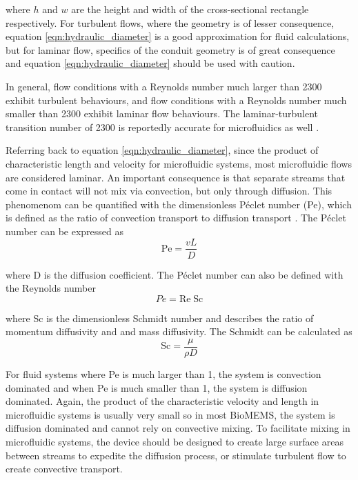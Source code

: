 \noindent where $h$ and $w$ are the height and width of the cross-sectional rectangle respectively. For turbulent flows, where the geometry is of lesser consequence, equation \ref{eqn:hydraulic_diameter} is a good approximation for fluid calculations, but for laminar flow, specifics of the conduit geometry is of great consequence and equation \ref{eqn:hydraulic_diameter} should be used with caution.

\par In general, flow conditions with a Reynolds number much larger than 2300 exhibit turbulent behaviours, and flow conditions with a Reynolds number much smaller than 2300 exhibit laminar flow behaviours. The laminar-turbulent transition number of 2300 is reportedly accurate for microfluidics as well \cite{david_j._beebe_physics_2002}.

\par Referring back to equation \ref{eqn:hydraulic_diameter}, since the product of characteristic length and velocity for microfluidic systems, most microfluidic flows are considered laminar. An important consequence is that separate streams that come in contact will not mix via convection, but only through diffusion. This phenomenom can be quantified with the dimensionless P\'eclet number (Pe), which is defined as the ratio of convection transport to diffusion transport \cite{nguyen_micromixersreview_2005}. The P\'eclet number can be expressed as 
\begin{equation}
    \text{Pe} = \frac{vL}{D}
\end{equation}

\noindent where D is the diffusion coefficient. The P\'eclet number can also be defined with the Reynolds number
\begin{equation}
    Pe = \text{Re}\;\text{Sc}
\end{equation}

\noindent where Sc is the dimensionless Schmidt number and describes the ratio of momentum diffusivity and and mass diffusivity. The Schmidt can be calculated as
\begin{equation}
    \text{Sc} = \frac{\mu}{\rho D}
\end{equation}

\par For fluid systems where Pe is much larger than 1, the system is convection dominated and when Pe is much smaller than 1, the system is diffusion dominated. Again, the product of the characteristic velocity and length in microfluidic systems is usually very small so in most BioMEMS, the system is diffusion dominated and cannot rely on convective mixing. To facilitate mixing in microfluidic systems, the device should be designed to create large surface areas between streams to expedite the diffusion process, or stimulate turbulent flow to create convective transport.


